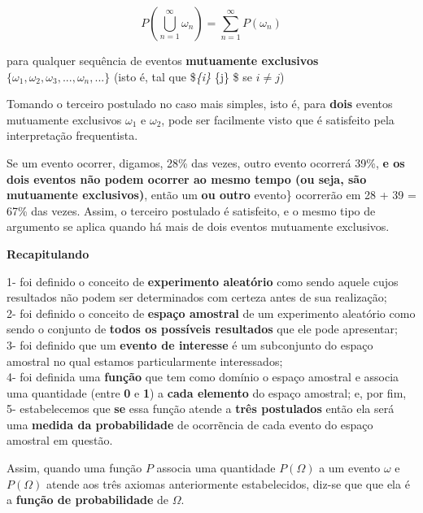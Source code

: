 \documentclass[
]{book}
\begin{document}
\hfill\break

\[
P\left(\bigcup _{n=1}^{\infty }{\omega}_{n}\right)=\sum _{n=1}^{\infty }P\left({\omega}_{n}\right)
\]

para qualquer sequência de eventos \textbf{mutuamente exclusivos} \(\{\omega_{1}, \omega_{2}, \omega_{3}, ..., \omega_{n}, ...\}\) (isto é, tal que \$\omega\emph{\{i\} \cap \omega}\{j\} \varnothing \$ se \(i \neq j\))

Tomando o terceiro postulado no caso mais simples, isto é, para \textbf{dois} eventos mutuamente exclusivos \(\omega_{1}\) e \(\omega_{2}\), pode ser facilmente visto que é satisfeito pela interpretação frequentista.

Se um evento ocorrer, digamos, 28\% das vezes, outro evento ocorrerá 39\%, \textbf{e os dois eventos não podem ocorrer ao mesmo tempo (ou seja, são mutuamente exclusivos)}, então um \textbf{ou outro} evento\} ocorrerão em 28 + 39 = 67\% das vezes. Assim, o terceiro postulado é satisfeito, e o mesmo tipo de argumento se aplica quando há mais de dois eventos mutuamente exclusivos.

\hfill\break

\textbf{Recapitulando}

\hfill\break

1- foi definido o conceito de \textbf{experimento aleatório} como sendo aquele cujos resultados não podem ser determinados com certeza antes de sua realização;\\
2- foi definido o conceito de \textbf{espaço amostral} de um experimento aleatório como sendo o conjunto de \textbf{todos os possíveis resultados} que ele pode apresentar;\\
3- foi definido que um \textbf{evento de interesse} é um subconjunto do espaço amostral no qual estamos particularmente interessados;\\
4- foi definida uma \textbf{função} que tem como domínio o espaço amostral e associa uma quantidade (entre \textbf{0} e \textbf{1}) a \textbf{cada elemento} do espaço amostral; e, por fim,\\
5- estabelecemos que \textbf{se} essa função atende a \textbf{três postulados} então ela será uma \textbf{medida da probabilidade} de ocorrẽncia de cada evento do espaço amostral em questão.

\hfill\break

Assim, quando uma função \(P\) associa uma quantidade \(P(\Omega)\) a um evento \(\omega\) e \(P(\Omega)\) atende aos três axiomas anteriormente estabelecidos, diz-se que que ela é a \textbf{função de probabilidade} de \(\Omega\).
\end{document}
